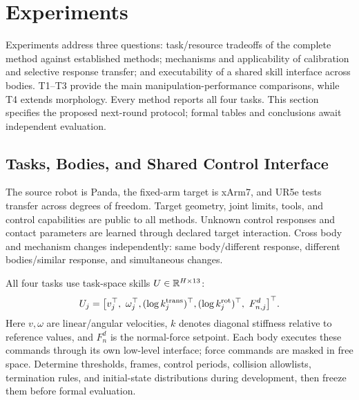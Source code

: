 \section{Experiments}
\label{sec:experiments}
Experiments address three questions: task/resource tradeoffs of the complete method
against established methods; mechanisms and applicability of calibration and selective
response transfer; and executability of a shared skill interface across bodies.
T1--T3 provide the main manipulation-performance comparisons, while T4 extends morphology.
Every method reports all four tasks. This section specifies the proposed next-round
protocol; formal tables and conclusions await independent evaluation.

\subsection{Tasks, Bodies, and Shared Control Interface}
The source robot is Panda, the fixed-arm target is xArm7, and UR5e tests transfer
across degrees of freedom. Target geometry, joint limits, tools, and control capabilities
are public to all methods. Unknown control responses and contact parameters are learned
through declared target interaction. Cross body and mechanism changes independently:
same body/different response, different bodies/similar response, and simultaneous changes.

All four tasks use task-space skills $U\in\mathbb R^{H\times13}$:
\begin{equation}
 U_j=\big[v_j^\top,\ \omega_j^\top,
 (\log k^{\rm trans}_j)^\top,
 (\log k^{\rm rot}_j)^\top,\ F^d_{n,j}\big]^\top.
 \label{eq:experimentalprimitive}
\end{equation}
Here $v,\omega$ are linear/angular velocities, $k$ denotes diagonal stiffness relative
to reference values, and $F_n^d$ is the normal-force setpoint. Each body executes these
commands through its own low-level interface; force commands are masked in free space.
Determine thresholds, frames, control periods, collision allowlists, termination rules,
and initial-state distributions during development, then freeze them before formal evaluation.

